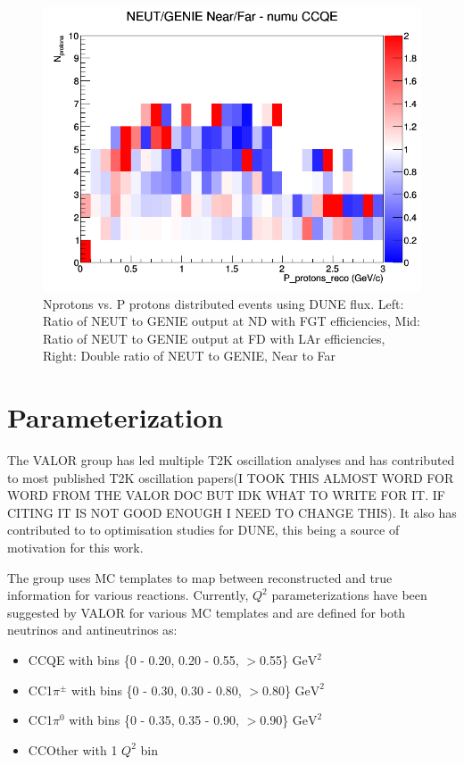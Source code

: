 \documentclass[12pt]{article}
\begin{document}
\begin{figure}[h]
\endminipage
{}
\includegraphics[width=\linewidth]{eff_N_P/FGT/protons/ratios/CCQE_NEUT_GENIE_numu_NF_N_P.png}
\endminipage
\caption{Nprotons vs. P protons distributed events using DUNE flux. Left: Ratio of NEUT to GENIE output at ND with FGT efficiencies, Mid: Ratio of NEUT to GENIE output at FD with LAr efficiencies, Right: Double ratio of NEUT to GENIE, Near to Far}
\end{figure}
\FloatBarrier

\section{Parameterization}
The VALOR group\cite{VALOR} has led multiple T2K oscillation analyses and has contributed to most published T2K oscillation papers(I TOOK THIS ALMOST WORD FOR WORD FROM THE VALOR DOC BUT IDK WHAT TO WRITE FOR IT. IF CITING IT IS NOT GOOD ENOUGH I NEED TO CHANGE THIS). It also has contributed to to optimisation studies for DUNE, this being a source of motivation for this work. 

The group uses MC templates to map between reconstructed and true information for various reactions. Currently, $Q^2$ parameterizations have been suggested by VALOR for various MC templates and are defined for both neutrinos and antineutrinos as: 
\begin{itemize}
\item CCQE with bins \{0 - 0.20, 0.20 - 0.55, $>$0.55\} $\textrm{GeV}^2$
\item CC1$\pi^{\pm}$ with bins \{0 - 0.30, 0.30 - 0.80, $>$0.80\} $\textrm{GeV}^2$
\item CC1$\pi^0$ with bins \{0 - 0.35, 0.35 - 0.90, $>$0.90\} $\textrm{GeV}^2$
\item CCOther with 1 $Q^2$ bin
\end{itemize}
\end{document}
